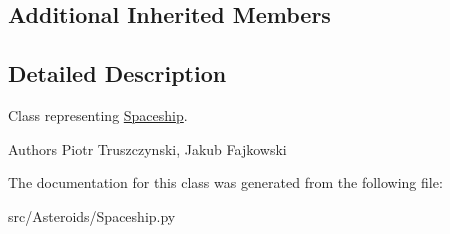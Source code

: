 \subsection*{Additional Inherited Members}


\subsection{Detailed Description}
Class representing \hyperlink{classSpaceship_1_1Spaceship}{Spaceship}. 

\begin{DoxyAuthor}{Authors}
Piotr Truszczynski, Jakub Fajkowski 
\end{DoxyAuthor}


The documentation for this class was generated from the following file\+:\begin{DoxyCompactItemize}
\item 
src/\+Asteroids/Spaceship.\+py\end{DoxyCompactItemize}
